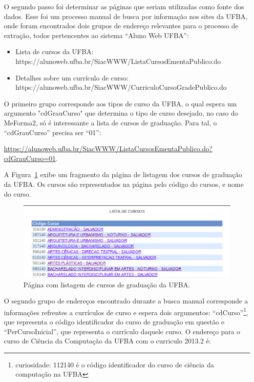 O segundo passo foi determinar as páginas que seriam utilizadas como fonte dos dados. Esse foi um processo manual de busca por informação nos sites da UFBA, onde foram encontrados dois grupos de endereço relevantes para o processo de extração, todos pertencentes ao sistema ``Aluno Web UFBA'':

\begin{itemize}
    \item Lista de cursos da UFBA: \\
    https://alunoweb.ufba.br/SiacWWW/ListaCursosEmentaPublico.do
    \item Detalhes sobre um currículo de curso: \\
    https://alunoweb.ufba.br/SiacWWW/CurriculoCursoGradePublico.do
\end{itemize}

O primeiro grupo corresponde aos tipos de curso da UFBA, o qual espera um argumento "cdGrauCurso" que determina o tipo de curso desejado, no caso do MeForma2, só é interessante a lista de cursos de graduação. Para tal, o ``cdGrauCurso'' precisa ser ``01'':

\url{https://alunoweb.ufba.br/SiacWWW/ListaCursosEmentaPublico.do?cdGrauCurso=01}.

A Figura~\ref{cursos} exibe um fragmento da página de listagem dos cursos de graduação da UFBA. Os cursos são representados na página pelo código do cursos, e nome do curso.

\begin{figure}[H]
	   \centering
	   		\includegraphics[scale=0.75]{pics/c4/0-cursos.png}
	   \caption{Página com listagem de cursos de graduação da UFBA.}
	   \label{cursos}
\end{figure}
O segundo grupo de endereços encontrado durante a busca manual corresponde a informações refrentes a currículos de curso e espera dois argumentos: ``cdCurso''\footnote{curiosidade: 112140 é o código identificador do curso de ciência da computação na UFBA}, que representa  o código identificador do curso de graduação em questão e ``PerCursoInicial'', que representa o currículo daquele curso. O endereço para o curso de Ciência da Computação da UFBA com o curriculo 2013.2 é:

